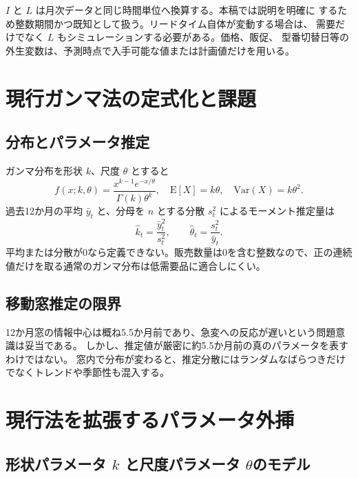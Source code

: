 \documentclass[a4paper,11pt]{jsarticle}
\begin{document}
$I$ と $L$ は月次データと同じ時間単位へ換算する。本稿では説明を明確に
するため整数期間かつ既知として扱う。リードタイム自体が変動する場合は、
需要だけでなく $L$ もシミュレーションする必要がある。価格、販促、
型番切替日等の外生変数は、予測時点で入手可能な値または計画値だけを用いる。

\section{現行ガンマ法の定式化と課題}
\subsection{分布とパラメータ推定}
ガンマ分布を形状 $k$、尺度 $\theta$ とすると
\[
f(x;k,\theta)=\frac{x^{k-1}e^{-x/\theta}}{\Gamma(k)\theta^k},
\quad \mathrm{E}[X]=k\theta,\quad \mathrm{Var}(X)=k\theta^2 .
\]
過去12か月の平均 $\bar y_t$ と、分母を $n$ とする分散 $s_t^2$ によるモーメント推定量は
\[
\hat k_t=\frac{\bar y_t^2}{s_t^2},\qquad
\hat\theta_t=\frac{s_t^2}{\bar y_t}.
\]
平均または分散が0なら定義できない。販売数量は0を含む整数なので、正の連続値だけを取る通常のガンマ分布は低需要品に適合しにくい。

\subsection{移動窓推定の限界}
12か月窓の情報中心は概ね5.5か月前であり、急変への反応が遅いという問題意識は妥当である。
しかし、推定値が厳密に約5.5か月前の真のパラメータを表すわけではない。
窓内で分布が変わると、推定分散にはランダムなばらつきだけでなくトレンドや季節性も混入する。

\section{現行法を拡張するパラメータ外挿}
\label{sec:parameter-extrapolation}
\subsection{\texorpdfstring{形状パラメータ $k$ と尺度パラメータ $\theta$}
{形状パラメータ k と尺度パラメータ theta}のモデル}
\end{document}

